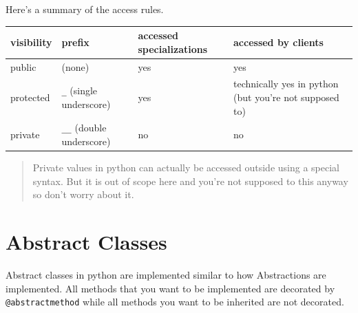 Here's a summary of the access rules.

\begin{longtable}[]{@{}
  >{\raggedright\arraybackslash}p{}
  >{\raggedright\arraybackslash}p{}
  >{\raggedright\arraybackslash}p{}
  >{\raggedright\arraybackslash}p{}@{}}
\toprule\noalign{}
\begin{minipage}[b]{\linewidth}\raggedright
visibility
\end{minipage} & \begin{minipage}[b]{\linewidth}\raggedright
prefix
\end{minipage} & \begin{minipage}[b]{\linewidth}\raggedright
accessed specializations
\end{minipage} & \begin{minipage}[b]{\linewidth}\raggedright
accessed by clients
\end{minipage} \\
\midrule\noalign{}
\endhead
\bottomrule\noalign{}
\endlastfoot
public & (none) & yes & yes \\
protected & \texttt{\_} (single underscore) & yes & technically yes in
python (but you're not supposed to) \\
private & \texttt{\_\_} (double underscore) & no & no \\
\end{longtable}

\begin{quote}
Private values in python can actually be accessed outside using a
special syntax. But it is out of scope here and you're not supposed to
this anyway so don't worry about it.
\end{quote}

\section{Abstract Classes}\label{oopython.md__abstract-classes}

Abstract classes in python are implemented similar to how Abstractions
are implemented. All methods that you want to be implemented are
decorated by \texttt{@abstractmethod} while all methods you want to be
inherited are not decorated.

